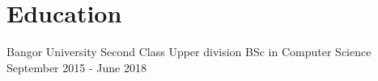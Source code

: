 \documentclass{my_cv}
\begin{document}



\section{Education}
\educationDetails
{Bangor University}
{Second Class Upper division BSc in Computer Science}
{September 2015 - June 2018}
\medskip



%
%
%
%
%
%
%

\end{document}
